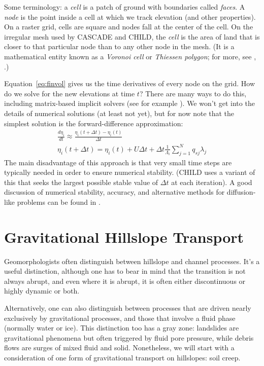 \documentclass[12pt,reqno]{amsart}
\begin{document}
Some terminology: a {\em cell} is a patch of ground with boundaries called {\em faces}. A {\em node} is the point inside a cell at which we track elevation (and other properties). On a raster grid, cells are square and nodes fall at the center of the cell. On the irregular mesh used by CASCADE and CHILD, the {\em cell} is the area of land that is closer to that particular node than to any other node in the mesh. (It is a mathematical entity known as a {\em Voronoi cell} or {\em Thiessen polygon}; for more, see \citet{braun1997modelling}, \citet{tucker2001object}.)

Equation~\ref{eq:finvol} gives us the time derivatives of every node on the grid. How do we solve for the new elevations at time $t$? There are many ways to do this, including matrix-based implicit solvers (see for example \citet{fagherazzi2002implicit}). We won't get into the details of numerical solutions (at least not yet), but for now note that the simplest solution is the forward-difference approximation:
\begin{eqnarray}
\frac{d\eta_i}{dt} \approx \frac{\eta_i(t+\Delta t) - \eta_i(t)}{\Delta t} \\
\eta_i(t+\Delta t) = \eta_i(t) + U\Delta t  + \Delta t \frac{1}{\Lambda_i} \sum_{j=1}^N q_{sj} \lambda_j
\end{eqnarray}
The main disadvantage of this approach is that very small time steps
are typically needed in order to ensure numerical stability. (CHILD
uses a variant of this that seeks the largest possible stable value of $\Delta t$ at each iteration). A good discussion of numerical stability, accuracy, and alternative methods for diffusion-like problems can be found in \citet{press2007numerical}.

\section{Gravitational Hillslope Transport}

Geomorphologists often distinguish between hillslope and channel processes. It's a useful distinction, although one has to bear in mind that the transition is not always abrupt, and even where it is abrupt, it is often either discontinuous or highly dynamic or both.

Alternatively, one can also distinguish between processes that are driven nearly exclusively by gravitational processes, and those that involve a fluid phase (normally water or ice). This distinction too has a gray zone: landslides are gravitational phenomena but often triggered by fluid pore pressure, while debris flows are surges of mixed fluid and solid. Nonetheless, we will start with a consideration of one form of gravitational transport on hillslopes: soil creep. 
\end{document}
